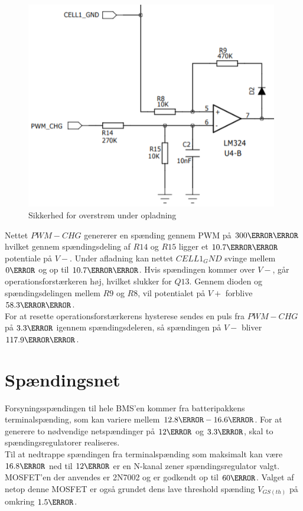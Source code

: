 \begin{figure}[h]
	\centering
	\includegraphics[width=11cm]{billeder/overcurrent_charge.png}
	\caption{Sikkerhed for overstrøm under opladning}
	\label{fig:overcurrent_charge}
\end{figure}

Nettet $PWM-CHG$ genererer en spænding gennem PWM på $300\milli\volt$ hvilket gennem spændingsdeling af $R14$ og $R15$ ligger et $10.7\milli\volt$ potentiale på $V-$. Under afladning kan nettet $CELL1_GND$ svinge mellem $0\volt$ og op til $10.7\milli\volt$. Hvis spændingen kommer over $V-$, går operationsforstærkeren høj, hvilket slukker for $Q13$. Gennem dioden og spændingsdelingen mellem $R9$ og $R8$, vil potentialet på $V+$ forblive $58.3\milli\volt$.
\\

For at resette operationsforstærkerens hysterese sendes en puls fra $PWM-CHG$ på $3.3\volt$ igennem spændingsdeleren, så spændingen på $V-$ bliver $117.9\milli\volt$.


\section{Spændingsnet}
Forsyningsspændingen til hele BMS'en kommer fra batteripakkens terminalspænding, som kan variere mellem $12.8\volt - 16.6\volt$. For at generere to nødvendige netspændinger på $12\volt$ og $3.3\volt$, skal to spændingsregulatorer realiseres.
\\

Til at nedtrappe spændingen fra terminalspænding som maksimalt kan være $16.8\volt$ ned til $12\volt$ er en N-kanal zener spændingsregulator valgt. MOSFET'en der anvendes er 2N7002 og er godkendt op til $60\volt$. Valget af netop denne MOSFET er også grundet dens lave threshold spænding $V_{GS(th)}$ på omkring  $1.5\volt$.
\\


